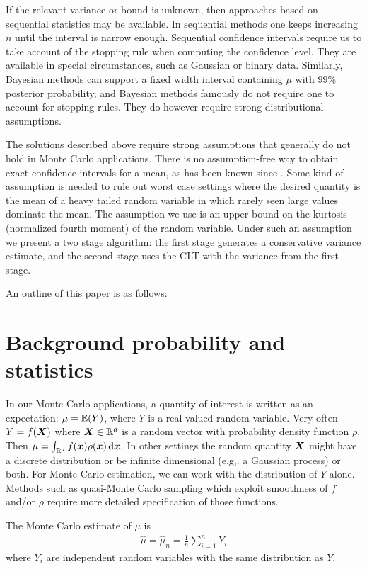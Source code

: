 \documentclass{article}
\begin{document}
If the relevant variance or bound is unknown, then approaches
based on sequential statistics \cite{sieg:1986}
may be available. In sequential methods one keeps increasing
$n$ until the interval is narrow enough. Sequential
confidence intervals require us to take account of the
stopping rule when computing the confidence level. They
are available in special circumstances, such as Gaussian
or binary data.
Similarly, Bayesian methods can support a fixed width
interval containing $\mu$ with $99$\% posterior probability, and
Bayesian methods famously do not require one to account
for stopping rules. 
They do however require strong distributional assumptions.

The solutions described above require strong 
assumptions that generally do not hold in Monte
Carlo applications.  There is no assumption-free
way to obtain exact confidence intervals for a mean,
as has been known since \cite{baha:sava:1956}.
Some kind of assumption is needed to rule out worst
case settings where the desired quantity is the
mean of a heavy tailed random variable in which
rarely seen large values dominate the mean.
The assumption we use is an upper bound on
the kurtosis (normalized fourth moment) of the
random variable. Under such an assumption we present
a two stage algorithm: the first stage generates
a conservative variance estimate, and the second stage
uses the CLT with the variance from the first stage.

An outline of this paper is as follows:


\section{Background probability and statistics}\label{sec:background}


In our Monte Carlo applications, a quantity of interest
is written as an expectation: $\mu = \mathbb{E}(Y)$, where $Y$
is a real valued random variable.  Very often
$Y = f(\boldsymbol{X})$ where $\boldsymbol{X}\in\mathbb{R}^d$ is a random vector
with probability density function $\rho$.
Then
$ \mu = \int_{\mathbb{R}^d}f(\boldsymbol{x})\rho(\boldsymbol{x})\,\mathrm{d}\boldsymbol{x}.$
In other settings the random quantity $\boldsymbol{X}$ might
have a discrete distribution or be infinite dimensional (e.g,. a Gaussian
process) or both. For Monte Carlo estimation, we can
work with the distribution of $Y$ alone. Methods such as
quasi-Monte Carlo sampling which exploit smoothness of $f$
and/or $\rho$ require more detailed specification of
those functions.

The Monte Carlo estimate of $\mu$ is
\begin{align}\label{eq:samplemean}
\hat\mu = \hat\mu_n = \frac1n\sum_{i=1}^nY_i
\end{align}
where $Y_i$ are independent random variables with the
same distribution as $Y$.
\end{document}
